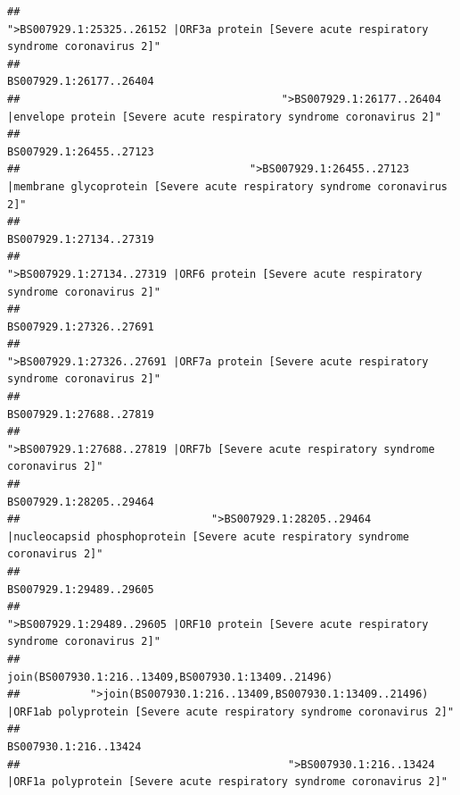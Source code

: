 \documentclass[
]{article}
\begin{document}
\begin{verbatim}
##                                            ">BS007929.1:25325..26152 |ORF3a protein [Severe acute respiratory syndrome coronavirus 2]" 
##                                                                                                                BS007929.1:26177..26404 
##                                         ">BS007929.1:26177..26404 |envelope protein [Severe acute respiratory syndrome coronavirus 2]" 
##                                                                                                                BS007929.1:26455..27123 
##                                    ">BS007929.1:26455..27123 |membrane glycoprotein [Severe acute respiratory syndrome coronavirus 2]" 
##                                                                                                                BS007929.1:27134..27319 
##                                             ">BS007929.1:27134..27319 |ORF6 protein [Severe acute respiratory syndrome coronavirus 2]" 
##                                                                                                                BS007929.1:27326..27691 
##                                            ">BS007929.1:27326..27691 |ORF7a protein [Severe acute respiratory syndrome coronavirus 2]" 
##                                                                                                                BS007929.1:27688..27819 
##                                                    ">BS007929.1:27688..27819 |ORF7b [Severe acute respiratory syndrome coronavirus 2]" 
##                                                                                                                BS007929.1:28205..29464 
##                              ">BS007929.1:28205..29464 |nucleocapsid phosphoprotein [Severe acute respiratory syndrome coronavirus 2]" 
##                                                                                                                BS007929.1:29489..29605 
##                                            ">BS007929.1:29489..29605 |ORF10 protein [Severe acute respiratory syndrome coronavirus 2]" 
##                                                                                    join(BS007930.1:216..13409,BS007930.1:13409..21496) 
##           ">join(BS007930.1:216..13409,BS007930.1:13409..21496) |ORF1ab polyprotein [Severe acute respiratory syndrome coronavirus 2]" 
##                                                                                                                  BS007930.1:216..13424 
##                                          ">BS007930.1:216..13424 |ORF1a polyprotein [Severe acute respiratory syndrome coronavirus 2]" 

\end{verbatim}
\end{document}

